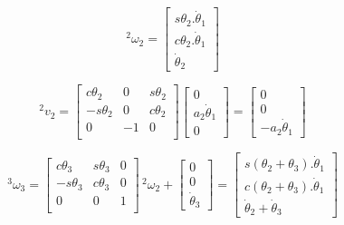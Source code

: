 \begin{equation}
    ^2\omega_2 = \begin{bmatrix}
        s\theta_2.\dot{\theta}_1 \\ c\theta_2.\dot{\theta}_1 \\ \dot{\theta}_2
    \end{bmatrix}
\end{equation}

\begin{equation}
    ^2v_2 = \begin{bmatrix}
        c\theta_2 & 0 & s\theta_2 \\
        -s\theta_2 & 0 & c\theta_2 \\
        0 & -1 & 0 \\
    \end{bmatrix} 
    \begin{bmatrix}
        0 \\ a_2\dot{\theta}_1 \\ 0
    \end{bmatrix} = 
    \begin{bmatrix}
        0 \\ 0 \\ -a_2\dot{\theta}_1
    \end{bmatrix}
\end{equation}

\begin{equation}
    ^3\omega_3 = \begin{bmatrix}
        c\theta_3 & s\theta_3 & 0 \\
        -s\theta_3 & c\theta_3 & 0 \\
        0 & 0 & 1 \\
    \end{bmatrix} \, ^2\omega_2 + 
    \begin{bmatrix}
        0 \\ 0 \\ \dot{\theta}_3
    \end{bmatrix} = 
    \begin{bmatrix}
        s(\theta_2+\theta_3).\dot{\theta}_1 \\
        c(\theta_2+\theta_3).\dot{\theta}_1 \\ 
        \dot{\theta}_2 + \dot{\theta}_3
    \end{bmatrix}
\end{equation}

